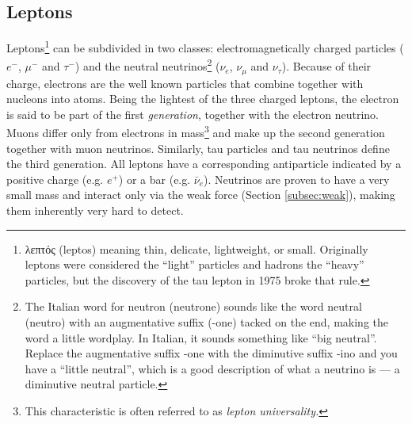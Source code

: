 \subsection{Leptons}
Leptons\footnote{\gr λεπτός \en (leptos) meaning thin, delicate, lightweight, or small. Originally leptons were considered the ``light'' particles and hadrons the ``heavy'' particles, but the discovery of the tau lepton in 1975 broke that rule.} can be subdivided in two classes: electromagnetically charged particles ($e^-$, $\mu^-$ and $\tau^-$) and the neutral neutrinos\footnote{The Italian word for neutron (neutrone) sounds like the word neutral (neutro) with an augmentative suffix (-one) tacked on the end, making the word a little wordplay. In Italian, it sounds something like ``big neutral''. Replace the augmentative suffix -one with the diminutive suffix -ino and you have a ``little neutral'', which is a good description of what a neutrino is — a diminutive neutral particle.} ($\nu_{e}$, $\nu_{\mu}$ and $\nu_{\tau}$). Because of their charge, electrons are the well known particles that combine together with nucleons into atoms. Being the lightest of the three charged leptons, the electron is said to be part of the first \textit{generation}, together with the electron neutrino. Muons differ only from electrons in mass\footnote{This characteristic is often referred to as \textit{lepton universality.}} and make up the second generation together with muon neutrinos. Similarly, tau particles and tau neutrinos define the third generation. All leptons have a corresponding antiparticle indicated by a positive charge (e.g. $e^+$) or a bar (e.g. $\bar{\nu}_e$). Neutrinos are proven to have a very small mass \cite{RevModPhys.88.030502} and interact only via the weak force (Section \ref{subsec:weak}), making them inherently very hard to detect.

